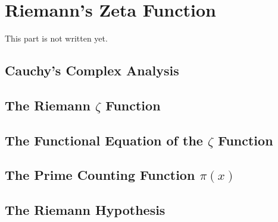\chapter{Riemann's Zeta Function}

This part is not written yet. \\

\td 

\section{Cauchy's Complex Analysis}

\section{The Riemann $\zeta$ Function}

\section{The Functional Equation of the $\zeta$ Function}

\section{The Prime Counting Function $\pi(x)$}

\section{The Riemann Hypothesis}